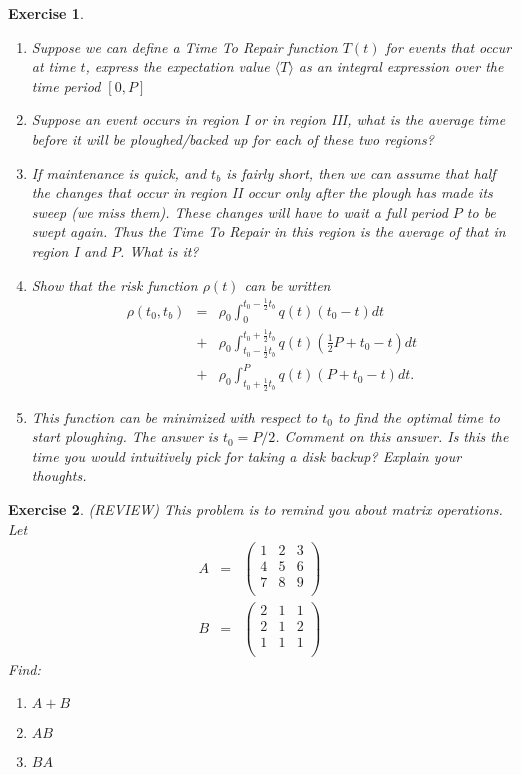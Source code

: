 \documentclass{book}
\newtheorem{exercise}{Exercise}
\def\beq{\begin{eqnarray}}
\def\eeq{\end{eqnarray}}
\def\2{\frac{1}{2}}
\begin{document}
\begin{exercise}
\begin{enumerate}
\item Suppose we can define a Time To Repair function $T(t)$ for events that occur
at time $t$, express the expectation value $\langle T\rangle$ as an integral expression
over the time period $[0,P]$

\item Suppose an event occurs in region I or in region III, what is the average time before it will be ploughed/backed up for each of these two regions?

\item If maintenance is quick, and $t_b$ is fairly short, then we can assume that
half the changes that occur in region II occur only after the plough
has made its sweep (we miss them). These changes will have to wait a
full period $P$ to be swept again. Thus the Time To Repair in this
region is the average of that in region I and $P$. What is it?

\item Show that the risk function $\rho(t)$ can be written
\beq
\rho(t_0,t_b) &=& \rho_0 \int_0^{t_0-\2t_b} q(t)(t_0-t)dt\nonumber\\
&+& \rho_0 \int_{t_0-\2t_b}^{t_0+\2t_b} q(t)(\2 P+t_0-t)dt\nonumber\\
&+& \rho_0 \int_{t_0+\2t_b}^{P} q(t)(P+t_0-t)dt.
\eeq

\item This function can be minimized with respect to $t_0$ to find the optimal time
to start ploughing. The answer is $t_0 = P/2$. Comment on this answer. Is this the time
you would intuitively pick for taking a disk backup? Explain your thoughts.

\end{enumerate}
\end{exercise}
\begin{solution}
\end{solution}



\begin{exercise}
(REVIEW) This problem is to remind you about matrix operations. Let
\beq
A &=& \left(
\begin{array}{ccc}
1 & 2 & 3\\
4 & 5 & 6\\
7 & 8 & 9\\
\end{array}
\right)\\
B &=& \left(
\begin{array}{ccc}
2 & 1 & 1\\
2 & 1 & 2\\
1 & 1 & 1\\
\end{array}
\right)
\eeq
Find:
\begin{enumerate}
\item $A+B$
\item $AB$ 
\item $BA$
\end{enumerate}
\end{exercise}
\begin{solution}
\end{solution}
\end{document}
